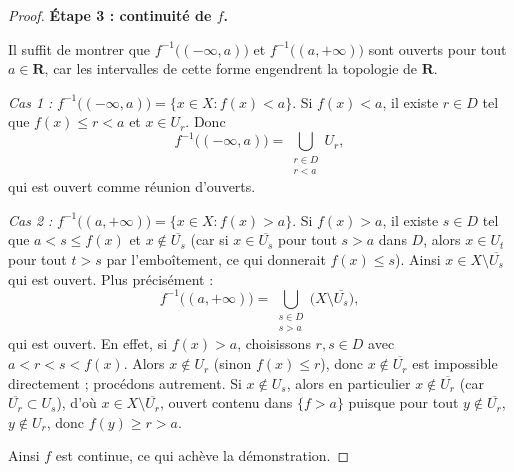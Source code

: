 \documentclass[12pt,a4paper,openany]{book}
\theoremstyle{definition}
\theoremstyle{cours}
\theoremstyle{coursnormal}
\begin{document}
\begin{proof}
\medskip\noindent
\textbf{Étape 3 : continuité de $f$.}

Il suffit de montrer que $f^{-1}\bigl((-\infty,a)\bigr)$ et
$f^{-1}\bigl((a,+\infty)\bigr)$ sont ouverts pour tout $a\in\mathbf{R}$,
car les intervalles de cette forme engendrent la topologie de
$\mathbf{R}$.

\emph{Cas 1 :} $f^{-1}\bigl((-\infty,a)\bigr)=\{x\in X: f(x)<a\}$.
Si $f(x)<a$, il existe $r\in D$ tel que $f(x)\le r<a$ et $x\in U_r$.
Donc
\[
f^{-1}\bigl((-\infty,a)\bigr) = \bigcup_{\substack{r\in D\\ r<a}} U_r,
\]
qui est ouvert comme réunion d'ouverts.

\emph{Cas 2 :} $f^{-1}\bigl((a,+\infty)\bigr)=\{x\in X: f(x)>a\}$.
Si $f(x)>a$, il existe $s\in D$ tel que $a<s\le f(x)$ et
$x\notin \overline{U_s}$ (car si $x\in\overline{U_s}$ pour tout
$s>a$ dans $D$, alors $x\in U_t$ pour tout $t>s$ par l'emboîtement,
ce qui donnerait $f(x)\le s$). Ainsi $x\in X\setminus\overline{U_s}$
qui est ouvert. Plus précisément :
\[
f^{-1}\bigl((a,+\infty)\bigr) = \bigcup_{\substack{s\in D\\ s>a}}
  \bigl(X\setminus \overline{U_s}\bigr),
\]
qui est ouvert. En effet, si $f(x)>a$, choisissons $r,s\in D$ avec
$a<r<s<f(x)$. Alors $x\notin U_r$ (sinon $f(x)\le r$), donc
$x\notin\overline{U_r}$ est impossible directement ; procédons autrement.
Si $x\notin U_s$, alors en particulier $x\notin\overline{U_r}$
(car $\overline{U_r}\subset U_s$), d'où $x\in X\setminus\overline{U_r}$,
ouvert contenu dans $\{f>a\}$ puisque pour tout $y\notin\overline{U_r}$,
$y\notin U_r$, donc $f(y)\ge r>a$.

Ainsi $f$ est continue, ce qui achève la démonstration.
\end{proof}
\end{document}
